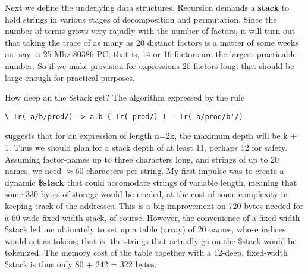 Next we define the underlying data structures. Recursion demands a \textbf{stack} to hold strings in various stages of decomposition and permutation. Since the number of terms grows very rapidly with the number of factors, it will turn out that taking the trace of as many as 20 distinct factors is a matter of some weeks on -say- a 25 Mhz 80386 PC; that is, 14 or 16 factors are the largest practicable number. So if we make provision for expressions 20 factors long, that should be large enough for practical purposes.



How deep an the \$stack get? The algorithm expressed by the rule

\begin{verbatim}
\ Tr( a/b/prod/) -> a.b ( Tr( prod/) ) - Tr( a/prod/b'/)
\end{verbatim}

suggests that for an expression of length n=2k, the maximum depth will be k + 1. Thus we should plan for a stack depth of at least 11, perhaps 12 for safety. Assuming factor-names up to three characters long, and strings of up to 20 names, we need $\approx$60 characters per string. My first impulse was to create a dynamic \textbf{\$stack} that could accomodate strings of variable length, meaning that some 330 bytes of storage would be needed, at the cost of some complexity in keeping track of the addresses. This is a big improvement on 720 bytes needed for a 60-wide fixed-width stack, of course. However, the convenience of a fixed-width \$stack led me ultimately to set up a table (array) of 20 names, whose indices would act as tokens; that is, the strings that actually go on the \$stack would be tokenized. The memory cost of the table together with a 12-deep, fixed-width \$stack is thus only 80 + 242 = 322 bytes.

